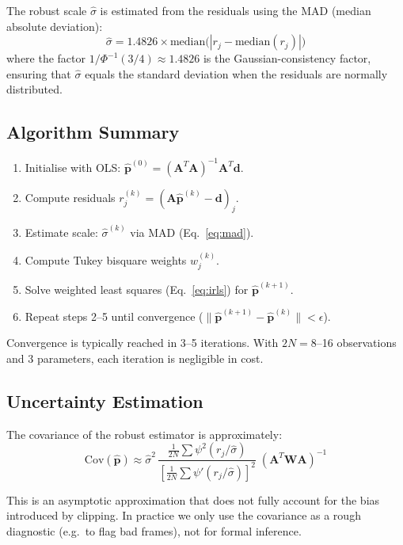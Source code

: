 \documentclass[SE,lsstdraft,authoryear,toc]{lsstdoc}
\begin{document}
The robust scale $\hat{\sigma}$ is estimated from the residuals using
the MAD (median absolute deviation):
\begin{equation}
\hat{\sigma} = 1.4826 \times \mathrm{median}\bigl(|r_j - \mathrm{median}(r_j)|\bigr)
\label{eq:mad}
\end{equation}
where the factor $1/\Phi^{-1}(3/4) \approx 1.4826$ is the
Gaussian-consistency factor, ensuring that $\hat{\sigma}$ equals the
standard deviation when the residuals are normally distributed.

\subsection{Algorithm Summary}

\begin{enumerate}
\item Initialise with OLS:
  $\hat{\mathbf{p}}^{(0)} = (\mathbf{A}^T\mathbf{A})^{-1}
  \mathbf{A}^T\mathbf{d}$.
\item Compute residuals $r_j^{(k)} = (\mathbf{A}\hat{\mathbf{p}}^{(k)}
  - \mathbf{d})_j$.
\item Estimate scale: $\hat{\sigma}^{(k)}$ via MAD
  (Eq.~\ref{eq:mad}).
\item Compute Tukey bisquare weights $w_j^{(k)}$.
\item Solve weighted least squares (Eq.~\ref{eq:irls}) for
  $\hat{\mathbf{p}}^{(k+1)}$.
\item Repeat steps 2--5 until convergence
  ($\|\hat{\mathbf{p}}^{(k+1)} - \hat{\mathbf{p}}^{(k)}\| < \epsilon$).
\end{enumerate}

\noindent
Convergence is typically reached in 3--5 iterations.  With $2N = 8$--16
observations and 3 parameters, each iteration is negligible in cost.

\subsection{Uncertainty Estimation}

The covariance of the robust estimator is approximately:
\begin{equation}
\mathrm{Cov}(\hat{\mathbf{p}})
\approx \hat{\sigma}^2\,
\frac{\frac{1}{2N}\sum \psi^2(r_j/\hat{\sigma})}
     {\left[\frac{1}{2N}\sum \psi'(r_j/\hat{\sigma})\right]^2}\;
(\mathbf{A}^T \mathbf{W} \mathbf{A})^{-1}
\label{eq:robust_cov}
\end{equation}

\noindent
This is an asymptotic approximation that does not fully account for
the bias introduced by clipping.  In practice we only use the
covariance as a rough diagnostic (e.g.\ to flag bad frames), not for formal inference.
\end{document}
